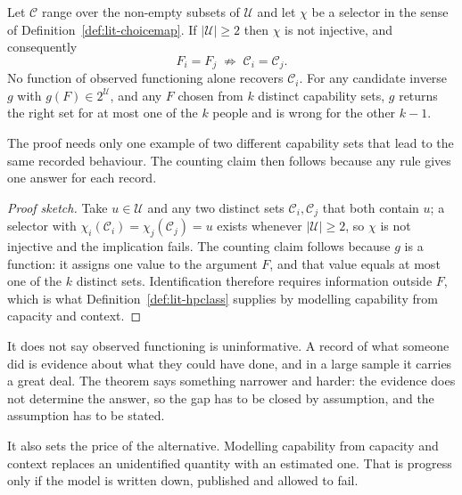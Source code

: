 \begin{theorem}
\label{thm:lit-identification}
Let $\mathcal C$ range over the non-empty subsets of $\mathcal U$ and let
$\chi$ be a selector in the sense of Definition~\ref{def:lit-choicemap}. If
$|\mathcal U|\ge2$ then $\chi$ is not injective, and consequently
\[
  F_i=F_j\;\not\Rightarrow\;\mathcal C_i=\mathcal C_j .
\]
No function of observed functioning alone recovers $\mathcal C_i$. For any
candidate inverse $g$ with $g(F)\in2^{\mathcal U}$, and any $F$ chosen from $k$
distinct capability sets, $g$ returns the right set for at most one of the $k$
people and is wrong for the other $k-1$.
\end{theorem}

The proof needs only one example of two different capability sets that lead to the same recorded behaviour. The counting claim then follows because any rule gives one answer for each record.

\begin{proof}[Proof sketch]
Take $u\in\mathcal U$ and any two distinct sets $\mathcal C_i,\mathcal C_j$ that
both contain $u$; a selector with $\chi_i(\mathcal C_i)=\chi_j(\mathcal
C_j)=u$ exists whenever $|\mathcal U|\ge2$, so $\chi$ is not injective and the
implication fails. The counting claim follows because $g$ is a function: it
assigns one value to the argument $F$, and that value equals at most one of the
$k$ distinct sets. Identification therefore requires information outside $F$,
which is what Definition~\ref{def:lit-hpclass} supplies by modelling capability
from capacity and context.
\end{proof}

\begin{reading}
It does not say observed functioning is uninformative. A record of what someone
did is evidence about what they could have done, and in a large sample it
carries a great deal. The theorem says something narrower and harder: the
evidence does not determine the answer, so the gap has to be closed by
assumption, and the assumption has to be stated.

It also sets the price of the alternative. Modelling capability from capacity
and context replaces an unidentified quantity with an estimated one. That is
progress only if the model is written down, published and allowed to fail.
\end{reading}

